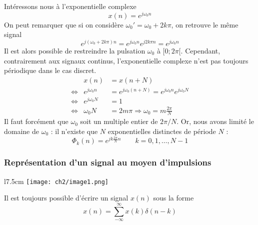 	Intéressons nous à l'exponentielle complexe
	\begin{equation}
	x(n) = e^{j\omega_0n}
	\end{equation}
	On peut remarquer que si on considère $\omega_0' = \omega_0+2k\pi$, on retrouve 
	le même signal
	\begin{equation}
	e^{j(\omega_0+2k\pi)n} = e^{j\omega_0n}e^{j2k\pi n} = e^{j\omega_0n}
	\end{equation}
	Il est alors possible de restreindre la pulsation $\omega_0$ à $[0;2\pi[$. Cependant, 
	contrairement aux signaux continus, l'exponentielle complexe n'est pas toujours 
	périodique dans le cas discret.
	\begin{equation}
	\begin{array}{lll}
	&x(n)&=  x(n+N)\\
	\Leftrightarrow &e^{j\omega_0n} &= e^{j\omega_0(n+N)} = e^{j\omega_0n}e^{j\omega_0N}\\
	\Leftrightarrow &e^{j\omega_0N} &= 1\\
	\Leftrightarrow &\omega_0N &= 2m\pi \Longrightarrow \omega_0 = m\frac{2\pi}{N}
	\end{array}
	\end{equation}
	Il faut forcément que $\omega_0$ soit un multiple entier de $2\pi/N$. Or, nous avons 
	limité le domaine de $\omega_0$ : il n'existe que $N$ exponentielles distinctes de 
	période $N$ :
	\begin{equation}
	\Phi_k(n) = e^{jk\frac{2\pi}{N}n}\qquad k=0,1,\dots, N-1
	\end{equation}
	
	

		\subsubsection{Représentation d'un signal au moyen d'impulsions}
		\begin{wrapfigure}[8]{l}{7.5cm}
		\vspace{-5mm}
		\texttt{[image: ch2/image1.png]}
		\end{wrapfigure}
		Il est toujours possible d'écrire un signal $x(n)$ sous la forme
		\begin{equation}
		x(n) = \sum_{-\infty}^\infty x(k)\delta(n-k)
		\end{equation}\ \\
		\\
		
	
	
